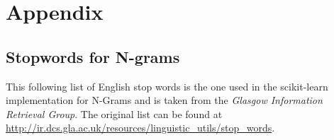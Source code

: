 
\renewcommand{\theequation}{B\arabic{equation}}
\setcounter{equation}{0}
\renewcommand{\thefigure}{B\arabic{figure}}
\setcounter{figure}{0}
\renewcommand{\thetable}{B\arabic{table}}
\setcounter{table}{0}


\clearpage

\thesisappendix

\section{Appendix}

\subsection*{Stopwords for N-grams}
\label{sub:Stopwords for N-grams}


This following list of English stop words is the one used in the \gls{scikit-learn} implementation for N-Grams and is taken from the \emph{Glasgow Information Retrieval Group}. The original list can be found at \url{http://ir.dcs.gla.ac.uk/resources/linguistic_utils/stop_words}.

